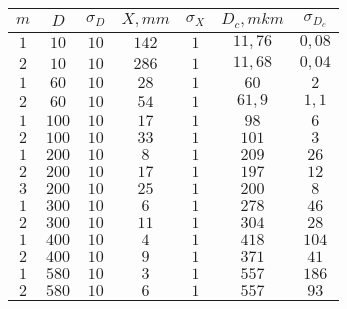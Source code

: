 \begin{tabular}{| c | c | c | c | c | c | c |}
\hline
$m$ & $D$ & $\sigma_D$ & $X, mm$ & $\sigma_X$ & $D_c, mkm$ & $\sigma_{D_c}$\\
\hline
$1$ & $10$ & $10$ & $142$ & $1$ & $11,76$ & $0,08$\\
\hline
$2$ & $10$ & $10$ & $286$ & $1$ & $11,68$ & $0,04$\\
\hline
$1$ & $60$ & $10$ & $28$ & $1$ & $60$ & $2$\\
\hline
$2$ & $60$ & $10$ & $54$ & $1$ & $61,9$ & $1,1$\\
\hline
$1$ & $100$ & $10$ & $17$ & $1$ & $98$ & $6$\\
\hline
$2$ & $100$ & $10$ & $33$ & $1$ & $101$ & $3$\\
\hline
$1$ & $200$ & $10$ & $8$ & $1$ & $209$ & $26$\\
\hline
$2$ & $200$ & $10$ & $17$ & $1$ & $197$ & $12$\\
\hline
$3$ & $200$ & $10$ & $25$ & $1$ & $200$ & $8$\\
\hline
$1$ & $300$ & $10$ & $6$ & $1$ & $278$ & $46$\\
\hline
$2$ & $300$ & $10$ & $11$ & $1$ & $304$ & $28$\\
\hline
$1$ & $400$ & $10$ & $4$ & $1$ & $418$ & $104$\\
\hline
$2$ & $400$ & $10$ & $9$ & $1$ & $371$ & $41$\\
\hline
$1$ & $580$ & $10$ & $3$ & $1$ & $557$ & $186$\\
\hline
$2$ & $580$ & $10$ & $6$ & $1$ & $557$ & $93$\\
\hline
\end{tabular}
